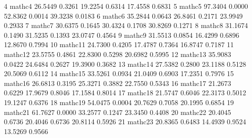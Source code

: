 \documentclass[
]{article}
\newenvironment{Shaded}{\begin{snugshade}}{\end{snugshade}}
\newcommand{\DecValTok}[1]{\textcolor[rgb]{0.00,0.00,0.81}{#1}}
\newcommand{\FloatTok}[1]{\textcolor[rgb]{0.00,0.00,0.81}{#1}}
\newcommand{\NormalTok}[1]{#1}
\begin{document}
\begin{Shaded}
\begin{Highlighting}[]
\DecValTok{4}\NormalTok{   mathc4  }\FloatTok{26.5449} \FloatTok{0.3261} \FloatTok{19.2254} \FloatTok{0.6314} \FloatTok{17.4558} \FloatTok{0.6831}
\DecValTok{5}\NormalTok{   mathc5  }\FloatTok{97.3404} \FloatTok{0.0000} \FloatTok{52.8362} \FloatTok{0.0014} \FloatTok{39.3238} \FloatTok{0.0183}
\DecValTok{6}\NormalTok{   mathc6  }\FloatTok{35.2844} \FloatTok{0.0643} \FloatTok{26.8461} \FloatTok{0.2171} \FloatTok{23.9949} \FloatTok{0.2933}
\DecValTok{7}\NormalTok{   mathc7  }\FloatTok{30.6375} \FloatTok{0.1645} \FloatTok{30.4324} \FloatTok{0.1708} \FloatTok{30.8269} \FloatTok{0.1271}
\DecValTok{8}\NormalTok{   mathc8  }\FloatTok{31.1674} \FloatTok{0.1490} \FloatTok{31.5235} \FloatTok{0.1393} \FloatTok{23.0747} \FloatTok{0.4564}
\DecValTok{9}\NormalTok{   mathc9  }\FloatTok{31.5513} \FloatTok{0.0854} \FloatTok{16.4299} \FloatTok{0.6896} \FloatTok{12.8670} \FloatTok{0.7994}
\DecValTok{10}\NormalTok{ mathc11  }\FloatTok{24.7300} \FloatTok{0.4205} \FloatTok{17.4787} \FloatTok{0.7364} \FloatTok{16.8747} \FloatTok{0.7187}
\DecValTok{11}\NormalTok{ mathc12  }\FloatTok{23.5755} \FloatTok{0.4861} \FloatTok{22.8300} \FloatTok{0.5298} \FloatTok{20.6982} \FloatTok{0.5995}
\DecValTok{12}\NormalTok{ mathc13  }\FloatTok{35.9083} \FloatTok{0.0422} \FloatTok{24.6484} \FloatTok{0.2627} \FloatTok{19.3900} \FloatTok{0.3682}
\DecValTok{13}\NormalTok{ mathc14  }\FloatTok{27.5382} \FloatTok{0.2800} \FloatTok{23.1188} \FloatTok{0.5128} \FloatTok{20.5069} \FloatTok{0.6112}
\DecValTok{14}\NormalTok{ mathc15  }\FloatTok{33.5261} \FloatTok{0.0934} \FloatTok{21.0409} \FloatTok{0.6903} \FloatTok{17.2351} \FloatTok{0.7976}
\DecValTok{15}\NormalTok{ mathc16  }\FloatTok{26.6813} \FloatTok{0.3195} \FloatTok{25.3271} \FloatTok{0.3882} \FloatTok{22.7550} \FloatTok{0.5343}
\DecValTok{16}\NormalTok{ mathc17  }\FloatTok{21.2673} \FloatTok{0.6229} \FloatTok{17.9679} \FloatTok{0.8046} \FloatTok{17.1584} \FloatTok{0.8014}
\DecValTok{17}\NormalTok{ mathc18  }\FloatTok{21.5747} \FloatTok{0.6046} \FloatTok{22.3173} \FloatTok{0.5012} \FloatTok{19.1247} \FloatTok{0.6376}
\DecValTok{18}\NormalTok{ mathc19  }\FloatTok{54.0475} \FloatTok{0.0004} \FloatTok{20.7629} \FloatTok{0.7058} \FloatTok{20.1995} \FloatTok{0.6854}
\DecValTok{19}\NormalTok{ mathc21  }\FloatTok{61.7627} \FloatTok{0.0000} \FloatTok{33.2577} \FloatTok{0.1247} \FloatTok{23.3450} \FloatTok{0.4408}
\DecValTok{20}\NormalTok{ mathc22  }\FloatTok{20.4045} \FloatTok{0.6736} \FloatTok{20.4046} \FloatTok{0.6736} \FloatTok{20.8114} \FloatTok{0.5926}
\DecValTok{21}\NormalTok{ mathc23  }\FloatTok{20.8365} \FloatTok{0.6483} \FloatTok{14.4939} \FloatTok{0.9524} \FloatTok{13.5269} \FloatTok{0.9566}

\end{Highlighting}
\end{Shaded}
\end{document}
